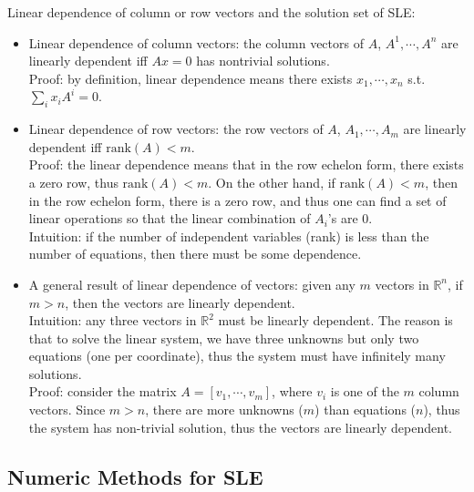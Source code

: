 \documentclass{report}
\begin{document}
Linear dependence of column or row vectors and the solution set of SLE: 
\begin{itemize}
\item Linear dependence of column vectors: the column vectors of $A$, $A^1, \cdots, A^n$ are linearly dependent iff $Ax = 0 $ has nontrivial solutions. \\
Proof: by definition, linear dependence means there exists $x_1, \cdots, x_n$ s.t. $\sum_i x_i A^i = 0$. 

\item Linear dependence of row vectors: the row vectors of $A$, $A_1, \cdots, A_m$ are linearly dependent iff $\text{rank}(A) < m$. \\
Proof: the linear dependence means that in the row echelon form, there exists a zero row, thus $\text{rank}(A) < m$. On the other hand, if $\text{rank}(A) < m$, then in the row echelon form, there is a zero row, and thus one can find a set of linear operations so that the linear combination of $A_i$'s are 0. \\
Intuition: if the number of independent variables (rank) is less than the number of equations, then there must be some dependence. 

\item A general result of linear dependence of vectors: given any $m$ vectors in $\mathbb{R}^n$, if $m > n$, then the vectors are linearly dependent. \\
Intuition: any three vectors in $\mathbb{R}^2$ must be linearly dependent. The reason is that to solve the linear system, we have three unknowns but only two equations (one per coordinate), thus the system must have infinitely many solutions. \\
Proof: consider the matrix $A = [v_1, \cdots, v_m]$, where $v_i$ is one of the $m$ column vectors. Since $m > n$, there are more unknowns ($m$) than equations ($n$), thus the system has non-trivial solution, thus the vectors are linearly dependent. 
\end{itemize}

\subsection{Numeric Methods for SLE}
\end{document}

